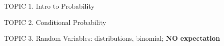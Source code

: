 \documentclass[handout]{mcs}
\begin{document}
\renewcommand{\reading}
{Chapter~\bref{probability_chap}{Intro to Probability};
Chapter~\bref{ran_var_chap}{Random Variables}
}


\begin{staffnotes}
TOPIC 1.  Intro to Probability

TOPIC 2.  Conditional Probability

TOPIC 3.  Random Variables: distributions, binomial; \textbf{NO expectation}
\end{staffnotes}

\end{document}
